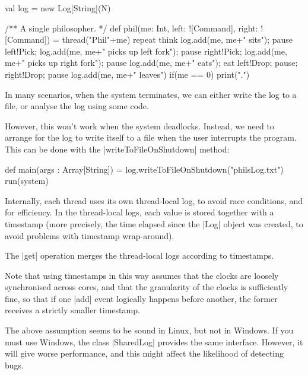 \documentclass[notes,color]{sepslide0}
\begin{document}

\begin{slide}

\begin{scala}
  val log = new Log[String](N)
 
  /** A single philosopher. */
  def phil(me: Int, left: ![Command], right: ![Command]) = thread("Phil"+me){
    repeat{
      think
      log.add(me, me+" sits"); pause
      left!Pick; log.add(me, me+" picks up left fork"); pause
      right!Pick; log.add(me, me+" picks up right fork"); pause
      log.add(me, me+" eats"); eat
      left!Drop; pause; right!Drop; pause
      log.add(me, me+" leaves")
      if(me == 0) print(".")
    }
  }
\end{scala}
\end{slide}


\begin{slide}

In many scenarios, when the system terminates, we can either write the
log to a file, or analyse the log using some code.

However, this won't work when the system deadlocks.  Instead, we need
to arrange for the log to write itself to a file when the user
interrupts the program.  This can be done with the
|writeToFileOnShutdown| method:
\begin{scala}
  def main(args : Array[String]) = {
    log.writeToFileOnShutdown("philsLog.txt")
    run(system)
  }
\end{scala}
\end{slide}



\begin{slide}

Internally, each thread uses its own thread-local log, to avoid race
conditions, and for efficiency.  In the thread-local logs, each value is
stored together with a timestamp (more precisely, the time elapsed since the
|Log| object was created, to avoid problems with timestamp wrap-around).

The |get| operation merges the thread-local logs according to
timestamps.
\end{slide}



\begin{slide}

Note that using timestamps in this way assumes that the clocks are loosely
synchronised across cores, and that the granularity of the clocks is
sufficiently fine, so that if one |add| event logically happens before
another, the former receives a strictly smaller timestamp.

The above assumption seems to be sound in Linux, but not in Windows.  If you
must use Windows, the  class |SharedLog| provides the same
interface.  However, it will give worse performance, and this might affect the
likelihood of detecting bugs. 
\end{slide}
\end{document}
